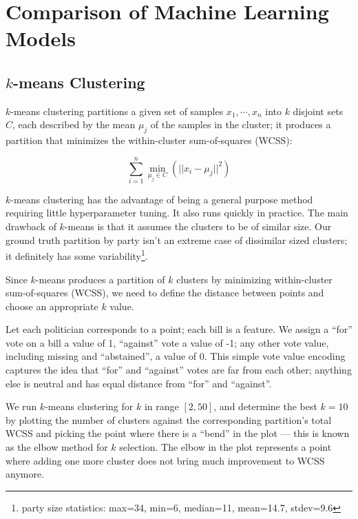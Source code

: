 
\chapter{Comparison of Machine Learning Models}
\label{ch:comparison}
\vspace{2em}

\section{$k$-means Clustering}
\label{sec:k_means_clustering}

$k$-means clustering partitions a given set of samples $x_1, \cdots, x_n$ into
$k$ disjoint sets $C$, each described by the mean $\mu_j$ of the samples in the
cluster;
it produces a partition that minimizes the within-cluster sum-of-squares (WCSS):

\[
    \sum_{i=1}^{n} \underset{\mu_j \in C}{\min}(||x_i - \mu_j||^2)
\]

$k$-means clustering has the advantage of being a general purpose method
requiring little hyperparameter tuning. It also runs quickly in practice.
The main drawback of $k$-means is that it assumes the clusters to be of similar size.
Our ground truth partition by party isn't an extreme case of dissimilar sized
clusters; it definitely has some variability\footnote{party size statistics:
max=34, min=6, median=11, mean=14.7, stdev=9.6}.

Since $k$-means produces a partition of $k$ clusters by minimizing within-cluster
sum-of-squares (WCSS), we need to define the distance between points and choose
an appropriate $k$ value.

Let each politician corresponds to a point; each bill is a feature.
We assign a ``for'' vote on a bill a value of 1, ``against'' vote a value of -1;
any other vote value, including missing and ``abstained'', a value of 0.
This simple vote value encoding captures the idea that ``for'' and ``against''
votes are far from each other; anything else is neutral and has equal distance
from ``for'' and ``against''.

We run $k$-means clustering for $k$ in range $[2, 50]$, and determine the best
$k=10$ by plotting the number of clusters against the corresponding partition's
total WCSS and picking the point where there is a ``bend'' in the plot
--- this is known as the elbow method for $k$ selection.
The elbow in the plot represents a point where adding one more cluster does not
bring much improvement to WCSS anymore.

